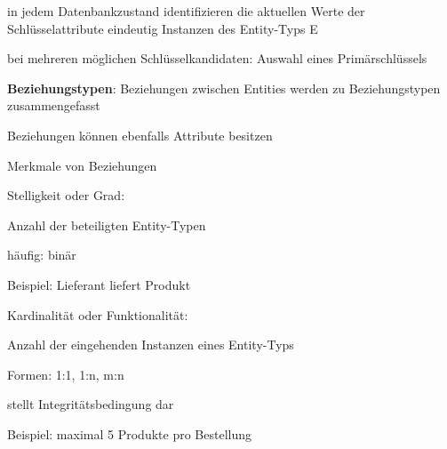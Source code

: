 \documentclass[a4paper]{article}
\begin{document}
\begin{multicols}{3}
\begin{itemize*}
    \begin{itemize*}
        \item in jedem Datenbankzustand identifizieren die aktuellen Werte der Schlüsselattribute eindeutig Instanzen des Entity-Typs E
        \item bei mehreren möglichen Schlüsselkandidaten: Auswahl eines Primärschlüssels
    \end{itemize*}
    \item \textbf{Beziehungstypen}: Beziehungen zwischen Entities werden zu Beziehungstypen zusammengefasst
    \begin{itemize*}
        \item Beziehungen können ebenfalls Attribute besitzen
    \end{itemize*}
\end{itemize*}


Merkmale von Beziehungen
\begin{itemize*}
    \item Stelligkeit oder Grad:
    \begin{itemize*}
        \item Anzahl der beteiligten Entity-Typen
        \item häufig: binär
        \item Beispiel: Lieferant liefert Produkt
    \end{itemize*}
    \item Kardinalität oder Funktionalität:
    \begin{itemize*}
        \item Anzahl der eingehenden Instanzen eines Entity-Typs
        \item Formen: 1:1, 1:n, m:n
        \item stellt Integritätsbedingung dar
        \item Beispiel: maximal 5 Produkte pro Bestellung
    \end{itemize*}
\end{itemize*}


\end{multicols}
\end{document}
